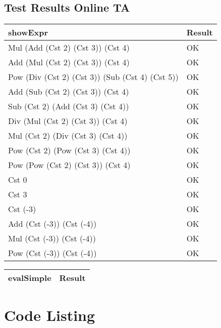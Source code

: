 \documentclass[12pt]{article}
\begin{document}
\subsection{Test Results Online TA}
\begin{table}[htbp]
\begin{tabularx}{\linewidth}{X|X}
 \textbf{showExpr} & Result \\
 \hline
   Mul (Add (Cst 2) (Cst 3)) (Cst 4) & OK \\
   \hline
    Add (Mul (Cst 2) (Cst 3)) (Cst 4) & OK \\
    Pow (Div (Cst 2) (Cst 3)) (Sub (Cst 4) (Cst 5)) & OK \\
    \hline
    Add (Sub (Cst 2) (Cst 3)) (Cst 4) & OK \\
    \hline
    Sub (Cst 2) (Add (Cst 3) (Cst 4)) & OK \\
    \hline
    Div (Mul (Cst 2) (Cst 3)) (Cst 4) & OK \\
    \hline
    Mul (Cst 2) (Div (Cst 3) (Cst 4)) & OK \\
    \hline
    Pow (Cst 2) (Pow (Cst 3) (Cst 4))& OK \\
    \hline
    Pow (Pow (Cst 2) (Cst 3)) (Cst 4)& OK \\
    \hline
    Cst 0 & OK \\
    \hline
    Cst 3 & OK \\
    \hline
    Cst (-3) & OK \\
    \hline
    Add (Cst (-3)) (Cst (-4)) & OK\\
    \hline
    Mul (Cst (-3)) (Cst (-4)) & OK\\
    \hline
    Pow (Cst (-3)) (Cst (-4)) & OK \\
\end{tabularx}
\end{table}


\begin{table}[htbp]
\begin{tabularx}{\linewidth}{X|X}
 \textbf{evalSimple} & Result \\
 \hline

\end{tabularx}
\end{table}


\appendix

\section{Code Listing}

\inputminted{haskell}{src/Arithmetic.hs}
\end{document}
